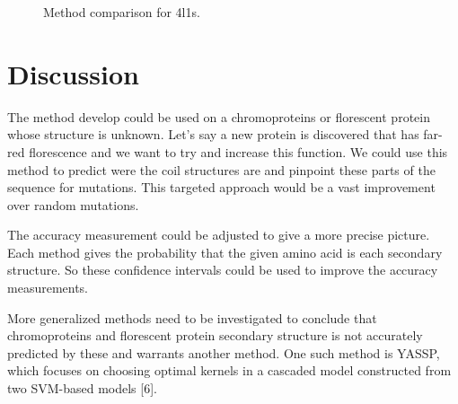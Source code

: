 \documentclass{article}
\begin{document}
\begin{figure}[h]
  \centering
  \caption{Method comparison for 4l1s. }
\end{figure}

\section{Discussion}

The method develop could be used on a chromoproteins or florescent protein whose structure is unknown. Let's say a new protein is discovered that has far-red florescence and we want to try and increase this function. We could use this method to predict were the coil structures are and pinpoint these parts of the sequence for mutations. This targeted approach would be a vast improvement over random mutations.

The accuracy measurement could be adjusted to give a more precise picture. Each method gives the probability that the given amino acid is each secondary structure. So these confidence intervals could be used to improve the accuracy measurements.

More generalized methods need to be investigated to conclude that chromoproteins and florescent protein secondary structure is not accurately predicted by these and warrants another method. One such method is YASSP, which focuses on choosing optimal kernels in a cascaded model constructed from two SVM-based models [6].
\end{document}

